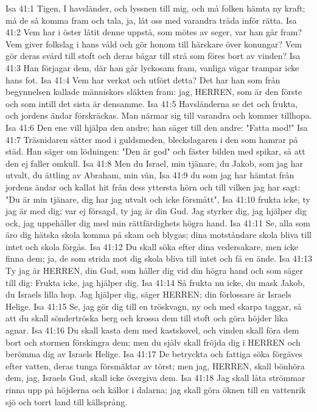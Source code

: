 Isa 41:1  Tigen, I havsländer, och lyssnen till mig, och må folken hämta ny kraft; må de så komma fram och tala, ja, låt oss med varandra träda inför rätta.
Isa 41:2  Vem har i öster låtit denne uppstå, som mötes av seger, var han går fram? Vem giver folkslag i hans våld och gör honom till härskare över konungar? Vem gör deras svärd till stoft och deras bågar till strå som föres bort av vinden?
Isa 41:3  Han förjagar dem, där han går lyckosam fram, vanliga vägar trampar icke hans fot.
Isa 41:4  Vem har verkat och utfört detta? Det har han som från begynnelsen kallade människors släkten fram: jag, HERREN, som är den förste och som intill det sista är densamme.
Isa 41:5  Havsländerna se det och frukta, och jordens ändar förskräckas. Man närmar sig till varandra och kommer tillhopa.
Isa 41:6  Den ene vill hjälpa den andre; han säger till den andre: "Fatta mod!"
Isa 41:7  Träsnidaren sätter mod i guldsmeden, bleckslagaren i den som hamrar på städ. Han säger om lödningen: "Den är god" och fäster bilden med spikar, så att den ej faller omkull.
Isa 41:8  Men du Israel, min tjänare, du Jakob, som jag har utvalt, du ättling av Abraham, min vän,
Isa 41:9  du som jag har hämtat från jordens ändar och kallat hit från dess yttersta hörn och till vilken jag har sagt: "Du är min tjänare, dig har jag utvalt och icke försmått",
Isa 41:10  frukta icke, ty jag är med dig; var ej försagd, ty jag är din Gud. Jag styrker dig, jag hjälper dig ock, jag uppehåller dig med min rättfärdighets högra hand.
Isa 41:11  Se, alla som äro dig hätska skola komma på skam och blygas; dina motståndare skola bliva till intet och skola förgås.
Isa 41:12  Du skall söka efter dina vedersakare, men icke finna dem; ja, de som strida mot dig skola bliva till intet och få en ände.
Isa 41:13  Ty jag är HERREN, din Gud, som håller dig vid din högra hand och som säger till dig: Frukta icke, jag hjälper dig.
Isa 41:14  Så frukta nu icke, du mask Jakob, du Israels lilla hop. Jag hjälper dig, säger HERREN; din förlossare är Israels Helige.
Isa 41:15  Se, jag gör dig till en tröskvagn, ny och med skarpa taggar, så att du skall söndertröska berg och krossa dem till stoft och göra höjder lika agnar.
Isa 41:16  Du skall kasta dem med kastskovel, och vinden skall föra dem bort och stormen förskingra dem; men du själv skall fröjda dig i HERREN och berömma dig av Israels Helige.
Isa 41:17  De betryckta och fattiga söka förgäves efter vatten, deras tunga försmäktar av törst; men jag, HERREN, skall bönhöra dem, jag, Israels Gud, skall icke övergiva dem.
Isa 41:18  Jag skall låta strömmar rinna upp på höjderna och källor i dalarna; jag skall göra öknen till en vattenrik sjö och torrt land till källsprång.
